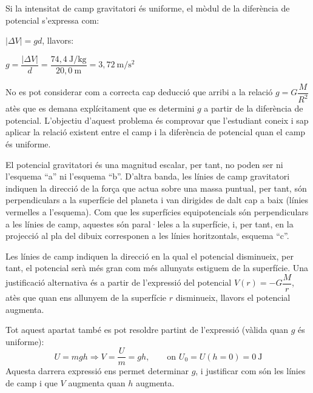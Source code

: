 \begin{solapartat}
Si la intensitat de camp gravitatori és uniforme, el mòdul de la diferència de potencial s'expressa com:

 $|\Delta V| = gd$, llavors:

 $g = \dfrac{|\Delta V|}{d} = \dfrac{74,4\ \mathrm{J/kg}}{20,0\ \mathrm{m}} = 3,72\ \mathrm{m/s^2}$

No es pot considerar com a correcta cap deducció que arribi a la relació $g = G\dfrac{M}{R^2}$ atès que es demana explícitament que es determini $g$ a partir de la diferència de potencial. L'objectiu d'aquest problema és comprovar que l'estudiant coneix i sap aplicar la relació existent entre el camp i la diferència de potencial quan el camp és uniforme.

 El potencial gravitatori és una magnitud escalar, per tant, no poden ser ni l'esquema ``a'' ni l'esquema ``b''. D'altra banda, les línies de camp gravitatori indiquen la direcció de la força que actua sobre una massa puntual, per tant, són perpendiculars a la superfície del planeta i van dirigides de dalt cap a baix (línies vermelles a l'esquema). Com que les superfícies equipotencials són perpendiculars a les línies de camp, aquestes són paral·leles a la superfície, i, per tant, en la projecció al pla del dibuix corresponen a les línies horitzontals, esquema ``c''.

 Les línies de camp indiquen la direcció en la qual el potencial disminueix, per tant, el potencial serà més gran com més allunyats estiguem de la superfície. Una justificació alternativa és a partir de l'expressió del potencial $V(r) = -G\dfrac{M}{r}$, atès que quan ens allunyem de la superfície $r$ disminueix, llavors el potencial augmenta.


Tot aquest apartat també es pot resoldre partint de l'expressió (vàlida quan $g$ és uniforme):
\[ U = mgh \Rightarrow V = \frac{U}{m} = gh, \qquad \text{on } U_0 = U(h=0) = 0\ \mathrm{J} \]
Aquesta darrera expressió ens permet determinar $g$, i justificar com són les línies de camp i que $V$ augmenta quan $h$ augmenta.
\end{solapartat}

